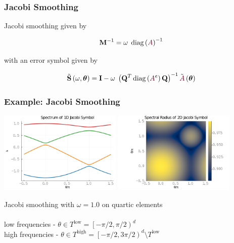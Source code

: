 \documentclass{beamer}
\DeclareMathOperator{\diag}{diag}
\begin{document}

\begin{frame}
\begin{center}
\frametitle{Jacobi Smoothing}

Jacobi smoothing given by

\begin{equation}
\mathbf{M}^{-1} = \omega \hspace{1mm} \diag \left( {\color{burgundy}A} \right)^{-1}
\end{equation}

with an error symbol given by

\begin{equation}
\tilde{\mathbf{S}} \left( \omega, \boldsymbol{\theta} \right) = \mathbf{I} - \omega \hspace{1mm} \left( \mathbf{Q}^T \diag \left( {\color{burgundy}A}^e \right) \mathbf{Q} \right)^{-1} \tilde{{\color{burgundy}A}} \left( \boldsymbol{\theta} \right)
\end{equation}

\end{center}
\end{frame}


\begin{frame}
\begin{center}
\frametitle{Example: Jacobi Smoothing}

\includegraphics[height=3.9cm]{../img/JacobiSymbol1D}
\includegraphics[height=3.9cm]{../img/JacobiSymbol2D}

Jacobi smoothing with $\omega = 1.0$ on quartic elements\\

~\\

low frequencies - $\theta \in T^{\text{low}} = \left[ - \pi / 2, \pi / 2 \right)^d$\\

high frequencies - $\theta \in T^{\text{high}} = \left[ - \pi / 2, 3 \pi / 2 \right)^d \setminus T^{\text{low}}$

\end{center}
\end{frame}
\end{document}
